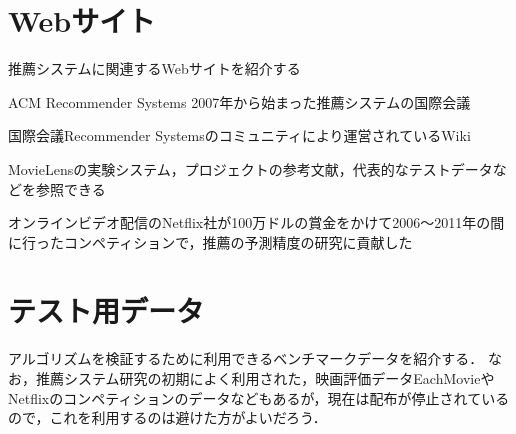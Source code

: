 \section{Webサイト}
\label{sec:reference-www}

推薦システムに関連するWebサイトを紹介する
\begin{description}
\item{ACM Recommender Systems}
2007年から始まった推薦システムの国際会議\cite{misc:143}
\item[ACM RecSysWiki]
国際会議Recommender Systemsのコミュニティにより運営されているWiki\cite{misc:144}
\item[GroupLens Research Lab.]
MovieLensの実験システム，プロジェクトの参考文献，代表的なテストデータなどを参照できる\cite{misc:132}
\item[Netflix Prize]
オンラインビデオ配信のNetflix社が100万ドルの賞金をかけて2006〜2011年の間に行ったコンペティションで，推薦の予測精度の研究に貢献した\cite{misc:142}
\end{description}

\section{テスト用データ}
\label{sec:reference-data}

アルゴリズムを検証するために利用できるベンチマークデータを紹介する．
なお，推薦システム研究の初期によく利用された，映画評価データEachMovieやNetflixのコンペティションのデータなどもあるが，現在は配布が停止されているので，これを利用するのは避けた方がよいだろう．

